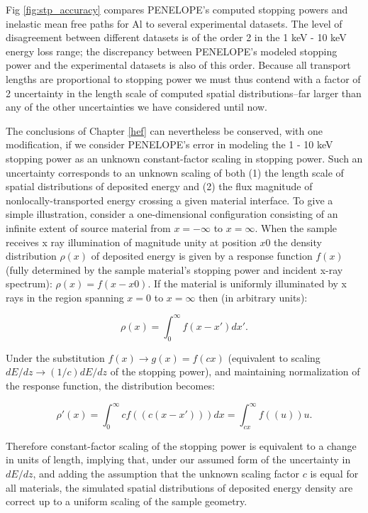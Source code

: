 \documentclass [11pt, proquest, article] {uwthesis}[2016/11/22]
\begin{document}
Fig \ref{fig:stp_accuracy} compares PENELOPE's computed stopping powers and inelastic mean free paths for Al to several experimental datasets. The level of disagreement between different datasets is of the order 2 in the 1 keV - 10 keV energy loss range; the discrepancy between PENELOPE's modeled stopping power and the experimental datasets is also of this order. Because all transport lengths are proportional to stopping power we must thus contend with a factor of 2 uncertainty in the length scale of computed spatial distributions--far larger than any of the other uncertainties we have considered until now. 

The conclusions of Chapter \ref{hef} can nevertheless be conserved, with one modification, if we consider PENELOPE's error in modeling the 1 - 10 keV stopping power as an unknown constant-factor scaling in stopping power. Such an uncertainty corresponds to an unknown scaling of both (1) the length scale of spatial distributions of deposited energy and (2) the flux magnitude of nonlocally-transported energy crossing a given material interface. To give a simple illustration, consider a one-dimensional configuration consisting of an infinite extent of source material from $x = -\infty$ to $x = \infty$. When the sample receives x ray illumination of magnitude unity at position $x0$ the density distribution $\rho(x)$ of deposited energy is given by a response function $f(x)$ (fully determined by the sample material's stopping power and incident x-ray spectrum): $ \rho(x) = f(x - x0) $. If the material is uniformly illuminated by x rays in the region spanning $x = 0$ to $x = \infty$ then (in arbitrary units):

$$
\rho(x) = \int_0^{\infty} f(x - x') dx'.
$$

Under the substitution $f(x) \rightarrow g(x) = f(c x)$ (equivalent to scaling $dE/dz \rightarrow (1/c) dE/dz$ of the stopping power), and maintaining normalization of the response function, the distribution becomes:

$$
\rho'(x) = \int_0^{\infty} c f((c (x -  x'))) dx = \int_{cx}^{\infty} f((u)) u.
$$

Therefore constant-factor scaling of the stopping power is equivalent to a change in units of length, implying that, under our assumed form of the uncertainty in $dE/dz$, and adding the assumption that the unknown scaling factor $c$ is equal for all materials, the simulated spatial distributions of deposited energy density are correct up to a uniform scaling of the sample geometry. 
\end{document}
